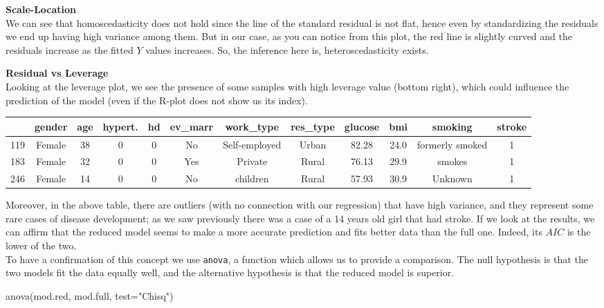 \documentclass[
]{article}
\newenvironment{Shaded}{\begin{snugshade}}{\end{snugshade}}
\newcommand{\AttributeTok}[1]{\textcolor[rgb]{0.77,0.63,0.00}{#1}}
\newcommand{\FunctionTok}[1]{\textcolor[rgb]{0.00,0.00,0.00}{#1}}
\newcommand{\NormalTok}[1]{#1}
\newcommand{\StringTok}[1]{\textcolor[rgb]{0.31,0.60,0.02}{#1}}
\begin{document}
\textbf{Scale-Location}\\
We can see that homoscedasticity does not hold since the line of the
standard residual is not flat, hence even by standardizing the residuals
we end up having high variance among them. But in our case, as you can
notice from this plot, the red line is slightly curved and the residuals
increase as the fitted \(Y\) values increases. So, the inference here
is, heteroscedasticity exists.

\textbf{Residual vs Leverage}\\
Looking at the leverage plot, we see the presence of some samples with
high leverage value (bottom right), which could influence the prediction
of the model (even if the R-plot does not show us its index).

\begin{longtable}[]{@{}lccccccccccc@{}}
\toprule
& gender & age & hypert. & hd & ev\_marr & work\_type & res\_type &
glucose & bmi & smoking & stroke \\
\midrule
\endhead
119 & Female & 38 & 0 & 0 & No & Self-employed & Urban & 82.28 & 24.0 &
formerly smoked & 1 \\
183 & Female & 32 & 0 & 0 & Yes & Private & Rural & 76.13 & 29.9 &
smokes & 1 \\
246 & Female & 14 & 0 & 0 & No & children & Rural & 57.93 & 30.9 &
Unknown & 1 \\
\bottomrule
\end{longtable}

Moreover, in the above table, there are outliers (with no connection
with our regression) that have high variance, and they represent some
rare cases of disease development; as we saw previously there was a case
of a 14 years old girl that had stroke. If we look at the results, we
can affirm that the reduced model seems to make a more accurate
prediction and fits better data than the full one. Indeed, its \(AIC\)
is the lower of the two.\\
To have a confirmation of this concept we use \texttt{anova}, a function
which allows us to provide a comparison. The null hypothesis is that the
two models fit the data equally well, and the alternative hypothesis is
that the reduced model is superior.

\begin{Shaded}
\begin{Highlighting}[]
\FunctionTok{anova}\NormalTok{(mod.red, mod.full, }\AttributeTok{test=}\StringTok{"Chisq"}\NormalTok{)}
\end{Highlighting}
\end{Shaded}
\end{document}

